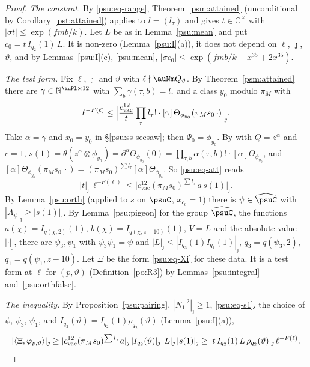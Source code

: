 \documentclass[10pt]{amsart}
\theoremstyle{definition}
\theoremstyle{remark}
\newcommand{\C}{\mathbb C}
\newcommand{\N}{\mathbb N}
\begin{document}
\begin{proof}
\emph{The constant.} By \eqref{psu:eq-range}, Theorem~\ref{psm:attained} (unconditional by
Corollary~\ref{pst:attained}) applies to $l=(l_\tau)$ and gives $t\in\C^\times$ with $|\sigma t|\le
\exp(fmb/k)$. Let $L$ be as in Lemma~\ref{psu:mean} and put $c_0=t\,I_{q_2}(1)\,L$. It is non-zero
(Lemma~\ref{psu:I}(a)), it does not depend on $\ell$, $\jmath$, $\vartheta$, and by
Lemmas~\ref{psu:I}(c), \ref{psu:mean}, $|\sigma c_0|\le\exp(fmb/k+x^{35}+2x^{35})$.

\emph{The test form.} Fix $\ell$, $\jmath$ and $\vartheta$ with $\ell\nmid\auNm Q_\vartheta$. By
Theorem~\ref{psm:attained} there are $\gamma\in\N^{\auPl\times12}$ with $\sum_b\gamma(\tau,b)=l_\tau$ and
a class $y_0$ modulo $\pi_M$ with
\begin{equation}\label{psu:eq-att}
\ell^{-F(\ell)}\le\Bigl|\frac{c_{\mathrm{vac}}^{12}}{t}\prod_\tau l_\tau!\cdot[\gamma]\,\Theta_{\phi_{y_0}}
(\pi_Ms_0\,\cdot)\Bigr|_\jmath .
\end{equation}
Take $\alpha=\gamma$ and $x_0=y_0$ in \S\ref{psu:ss-seesaw}; then $\Psi_0=\phi_{y_0}$. By
{\cite[(33)]{P49}} with $Q=z^\alpha$ and $c=1$, $s(1)=\theta(z^\alpha\otimes\phi_{y_0})=\partial^\alpha
\Theta_{\phi_{y_0}}(0)=\prod_{\tau,b}\alpha(\tau,b)!\cdot[\alpha]\Theta_{\phi_{y_0}}$, and $[\alpha]\Theta_{\phi_{y_0}}
(\pi_Ms_0\,\cdot)=(\pi_Ms_0)^{\sum l_\tau}[\alpha]\Theta_{\phi_{y_0}}$. So \eqref{psu:eq-att} reads
\begin{equation}\label{psu:eq-s1}
|t|_\jmath\,\ell^{-F(\ell)}\le\bigl|c_{\mathrm{vac}}^{12}(\pi_Ms_0)^{\sum l_\tau}\,a\,s(1)\bigr|_\jmath .
\end{equation}
By Lemma~\ref{psu:orth} (applied to $s$ on $\psuC$, $x_{c_0}=1$) there is $\psi\in\widehat\psuC$ with
$|A_\psi|_\jmath\ge|s(1)|_\jmath$. By Lemma~\ref{psu:pigeon} for the group $\widehat\psuC$, the functions
$a(\chi)=I_{q(\chi,2)}(1)$, $b(\chi)=I_{q(\chi,z-10)}(1)$, $V=L$ and the absolute value $|\cdot|_\jmath$,
there are $\psi_3,\psi_1$ with $\psi_3\psi_1=\psi$ and $|L|_\jmath\le|I_{q_3}(1)I_{q_1}(1)|_\jmath$,
$q_3=q(\psi_3,2)$, $q_1=q(\psi_1,z-10)$. Let $\Xi$ be the form \eqref{psu:eq-Xi} for these data. It is
a test form at $\ell$ for $(p,\vartheta)$ (Definition~\ref{po:R3}) by Lemmas~\ref{psu:integral}
and~\ref{psu:orthfalse}.

\emph{The inequality.} By Proposition~\ref{psu:pairing}, $|N_1^{-2}|_\jmath\ge1$, \eqref{psu:eq-s1}, the
choice of $\psi$, $\psi_3$, $\psi_1$, and $I_{q_2}(\vartheta)=I_{q_2}(1)\rho_{q_2}(\vartheta)$
(Lemma~\ref{psu:I}(a)),
\[
|\langle\Xi,\varphi_{p,\vartheta}\rangle|_\jmath\ge|c_{\mathrm{vac}}^{12}(\pi_Ms_0)^{\sum l_\tau}a|_\jmath\,
|I_{q_2}(\vartheta)|_\jmath\,|L|_\jmath\,|s(1)|_\jmath\ge|t\,I_{q_2}(1)\,L\,\rho_{q_2}(\vartheta)|_\jmath\,
\ell^{-F(\ell)} .\qedhere
\]
\end{proof}
\end{document}
